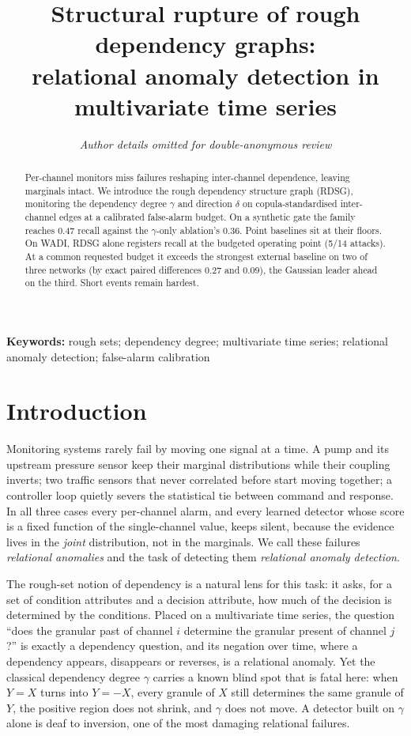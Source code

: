 \documentclass[11pt,a4paper]{article}
\title{Structural rupture of rough dependency graphs:\\
relational anomaly detection in multivariate time series}
\author{\normalsize\itshape Author details omitted for double-anonymous review}
\date{}
\newcommand{\keywords}[1]{\vspace{0.5em}
\noindent \textbf{Keywords:} #1}
\begin{document}
\maketitle

\begin{abstract}{\sloppy
Per-channel monitors miss failures reshaping inter-channel dependence,
leaving marginals intact. We introduce the rough dependency structure
graph (RDSG), monitoring the dependency degree $\gamma$ and direction
$\delta$ on copula-standardised inter-channel edges at a calibrated
false-alarm budget.
On a synthetic gate the family reaches 0.47 recall against the
$\gamma$-only ablation's 0.36. Point baselines sit at their floors. On WADI, RDSG alone
registers recall at the budgeted operating point (5/14 attacks). At a
common requested budget it exceeds the strongest external baseline on two of three
networks (by exact paired differences $0.27$ and $0.09$), the Gaussian leader
ahead on the third. Short events
remain hardest.
}\end{abstract}

\keywords{rough sets; dependency degree; multivariate time series;
relational anomaly detection; false-alarm calibration}

\section{Introduction}\label{sec:intro}

Monitoring systems rarely fail by moving one signal at a time. A pump and its
upstream pressure sensor keep their marginal distributions while their
coupling inverts; two traffic sensors that never correlated before start
moving together; a controller loop quietly severs the statistical tie between
command and response. In all three cases every per-channel alarm, and every
learned detector whose score is a fixed function of the single-channel value,
keeps silent, because the evidence lives in the \emph{joint} distribution, not
in the marginals. We call these failures \emph{relational anomalies} and the
task of detecting them \emph{relational anomaly detection}.

The rough-set notion of dependency \citep{pawlak1982,ziarko1993} is a natural
lens for this task: it asks, for a set of condition attributes and a decision
attribute, how much of the decision is determined by the conditions. Placed on
a multivariate time series, the question ``does the granular past of channel
$i$ determine the granular present of channel $j$?'' is exactly a dependency
question, and its negation over time, where a dependency appears, disappears
or reverses, is a relational anomaly. Yet the classical dependency degree
$\gamma$ carries a known blind spot that is fatal here: when $Y=X$ turns into
$Y=-X$, every granule of $X$ still determines the same granule of $Y$, the
positive region does not shrink, and $\gamma$ does not move. A detector built
on $\gamma$ alone is deaf to inversion, one of the most damaging relational
failures.
\end{document}

